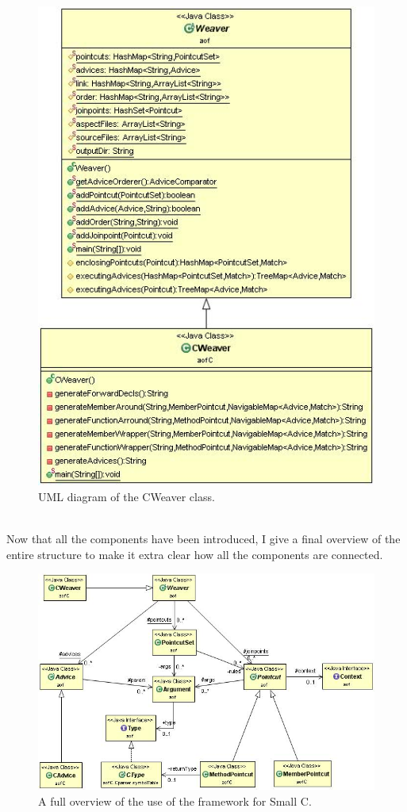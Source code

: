 \documentclass[a4paper]{report}
\begin{document}
\begin{figure}
\centering
\includegraphics[scale=0.7]{images/AOFC/CWeaver.jpg}
\caption{UML diagram of the CWeaver class.}
\label{fig:CWeaver}
\end{figure}
\\
Now that all the components have been introduced, I give a final overview of the entire structure to make it extra clear how all the components are connected.\\
\begin{figure}
\centering
\includegraphics[scale=0.55]{images/AOFC/CFull.jpg}
\caption{A full overview of the use of the framework for Small C.}
\label{fig:CFull}
\end{figure}
\end{document}
